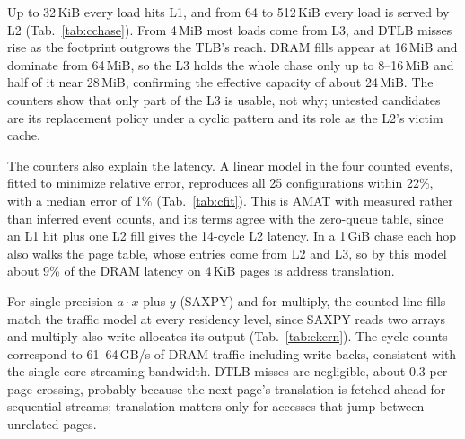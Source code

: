 \documentclass{article}
\begin{document}
Up to 32\,KiB every load hits L1, and from 64 to 512\,KiB every load is served by L2 (Tab.~\ref{tab:cchase}). From 4\,MiB most loads come from L3, and DTLB misses rise as the footprint outgrows the TLB's reach. DRAM fills appear at 16\,MiB and dominate from 64\,MiB, so the L3 holds the whole chase only up to 8--16\,MiB and half of it near 28\,MiB, confirming the effective capacity of about 24\,MiB. The counters show that only part of the L3 is usable, not why; untested candidates are its replacement policy under a cyclic pattern and its role as the L2's victim cache.

The counters also explain the latency. A linear model in the four counted events, fitted to minimize relative error, reproduces all 25 configurations within 22\%, with a median error of 1\% (Tab.~\ref{tab:cfit}). This is AMAT with measured rather than inferred event counts, and its terms agree with the zero-queue table, since an L1 hit plus one L2 fill gives the 14-cycle L2 latency. In a 1\,GiB chase each hop also walks the page table, whose entries come from L2 and L3, so by this model about 9\% of the DRAM latency on 4\,KiB pages is address translation.

For single-precision $a\cdot x$ plus $y$ (SAXPY) and for multiply, the counted line fills match the traffic model at every residency level, since SAXPY reads two arrays and multiply also write-allocates its output (Tab.~\ref{tab:ckern}). The cycle counts correspond to 61--64\,GB/s of DRAM traffic including write-backs, consistent with the single-core streaming bandwidth. DTLB misses are negligible, about 0.3 per page crossing, probably because the next page's translation is fetched ahead for sequential streams; translation matters only for accesses that jump between unrelated pages.
\end{document}
